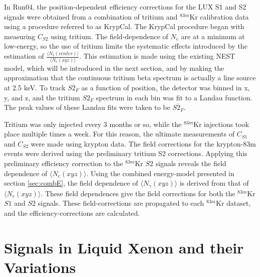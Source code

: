 In Run04, the position-dependent efficiency corrections for the LUX S1 and S2 signals were obtained from a combination of tritium and $^{83m}$Kr calibration data using a procedure referred to as KrypCal\cite{richard}. The KrypCal procedure began with measuring  $C_{S2}$ using tritium. The field-dependence of $N_{e}$ are at a minimum at low-energy, so the use of tritium limits the systematic effects introduced by the estimation of $\frac{\langle N_{e}(center)\rangle}{\langle N_{e}(xyz)\rangle}$. This estimation is made using the existing NEST model, which will be introduced in the next section, and by making the approximation that the continuous tritium beta spectrum is actually a line source at 2.5 keV. To track $\overline{S2_F}$ as a function of position, the detector was binned in x, y, and z, and the tritium $S2_F$ spectrum in each bin was fit to a Landau function. The peak values of these Landau fits were taken to be $\overline{S2_F}$.

Tritium was only injected every 3 months or so, while the $^{83m}$Kr injections took place multiple times a week. For this reason, the ultimate measurements of $C_{S1}$ and $C_{S2}$ were made using krypton data. The field corrections for the krypton-83m events were derived using the preliminary tritium S2 corrections. Applying this preliminary efficiency correction to the $^{83m}$Kr $S2$ signals reveals the field dependence of $\langle N_{e}(xyz)\rangle$. Using the combined energy-model presented in section \ref{sec:combE}, the field dependence of $\langle N_{\gamma}(xyz)\rangle$ is derived from that of $\langle N_{e}(xyz)\rangle$. These field dependences give the field corrections for both the $^{83m}$Kr $S1$ and $S2$ signals. These field-corrections are propagated to each $^{83m}$Kr dataset, and the efficiency-corrections are calculated.

\section{Signals in Liquid Xenon and their Variations}
